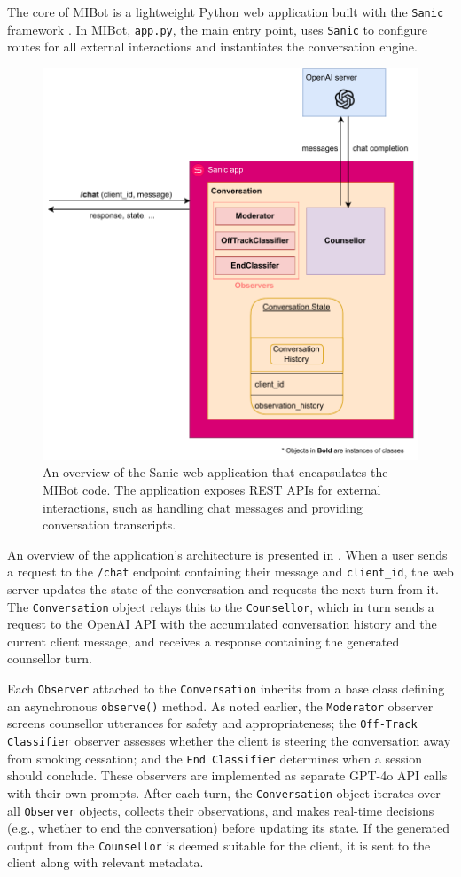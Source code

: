 The core of MIBot is a lightweight Python web application built with the \texttt{Sanic}
framework \citep{pi_sanic}. In MIBot, \texttt{app.py}, the main entry point, uses
\texttt{Sanic} to configure routes for all external interactions and instantiates the
conversation engine.
\begin{figure}[ht]
	\centering
	\includegraphics[width=0.7\linewidth]{fig/microservice.drawio.pdf}
	\caption[MIBot Sanic Application Overview]{An overview of the Sanic web application that encapsulates the MIBot code. The application exposes REST APIs for external interactions, such as handling chat messages and providing conversation transcripts.}
	\label{fig:microservice}
\end{figure}
An overview of the application's architecture is presented in . When a user sends a request to the \texttt{/chat} endpoint containing their message and \texttt{client\_id}, the web server updates the state of the conversation and requests the next turn from it. The \texttt{Conversation} object relays this to the \texttt{Counsellor}, which in turn sends a request to the OpenAI API with the accumulated conversation history and the current client message, and receives a response containing the generated counsellor turn.

Each \texttt{Observer} attached to the \texttt{Conversation} inherits from a base class
defining an asynchronous \texttt{observe()} method. As noted earlier, the
\texttt{Moderator} observer screens counsellor utterances for safety and
appropriateness; the \texttt{Off-Track Classifier} observer assesses whether the client
is steering the conversation away from smoking cessation; and the \texttt{End
	Classifier} determines when a session should conclude. These observers are implemented
as separate GPT-4o API calls with their own prompts. After each turn, the
\texttt{Conversation} object iterates over all \texttt{Observer} objects, collects
their observations, and makes real-time decisions (e.g., whether to end the
conversation) before updating its state. If the generated output from the
\texttt{Counsellor} is deemed suitable for the client, it is sent to the client along
with relevant metadata.


